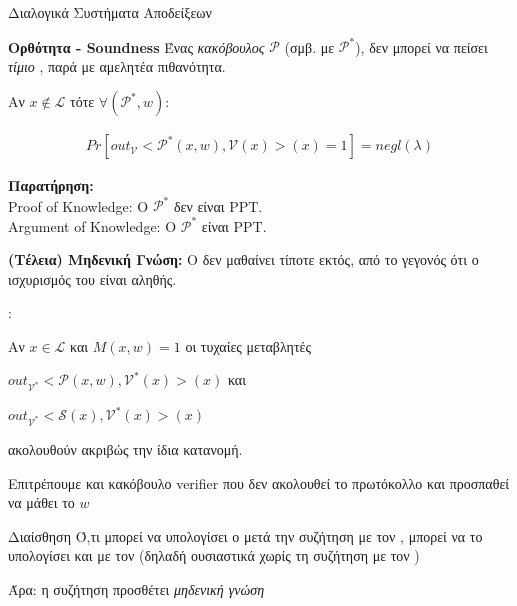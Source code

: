 \documentclass[handout]{beamer}
\begin{document}
\begin{frame}[allowframebreaks]{Διαλογικά Συστήματα Αποδείξεων}
\framebreak

\begin{block}{\textbf{Ορθότητα - Soundness}}
Ένας \emph{κακόβουλος} $\mathcal{P}$ (σμβ. με $\mathcal{P}^*$), δεν μπορεί να πείσει \emph{τίμιο} \ver, παρά με αμελητέα πιθανότητα.

Αν $x \notin \mathcal{L}$ τότε $\forall (\mathcal{P}^*,w)$: 

\begin{align*}
Pr[out_{\mathcal{V}}<\mathcal{P}^*(x,w), \mathcal{V}(x)>(x)=1] = negl(\lambda)
\end{align*} 
\end{block}

\textbf{Παρατήρηση: }\\
Proof of Knowledge: O $\mathcal{P}^*$ \alert{δεν} είναι PPT. \\
Argument of Knowledge: O $\mathcal{P}^*$  είναι PPT.

\framebreak

\begin{block}{\textbf{(Τέλεια) Μηδενική Γνώση:}}
O \ver δεν μαθαίνει τίποτε εκτός, από το γεγονός ότι ο ισχυρισμός του \prv είναι αληθής.
 
 : 

Αν  $x \in \mathcal{L}$ και $M(x,w) = 1$ οι τυχαίες μεταβλητές 

$ out_{\mathcal{V}^*}<\mathcal{P}(x,w), \mathcal{V}^*(x)>(x) $ και 

$ out_{\mathcal{V}^*}<\mathcal{S}(x), \mathcal{V}^*(x)>(x) $ 

ακολουθούν ακριβώς την ίδια κατανομή.
\end{block}

Επιτρέπουμε και \alert{κακόβουλο verifier} που δεν ακολουθεί το πρωτόκολλο και προσπαθεί να μάθει το $w$

\framebreak

\begin{block}{Διαίσθηση}
Ό,τι μπορεί να υπολογίσει ο \ver μετά την συζήτηση με τον \prv, μπορεί να το υπολογίσει και με τον \siml (δηλαδή ουσιαστικά χωρίς τη συζήτηση
με τον \prv)

Άρα: η συζήτηση προσθέτει \emph{μηδενική γνώση}

\end{block}
\end{frame}
\end{document}
